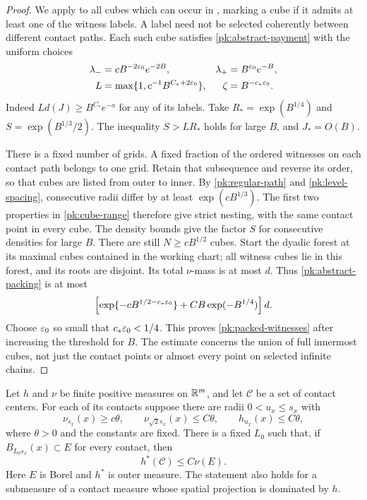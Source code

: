 \begin{proof}
We apply  to all cubes which can occur in
, marking a cube if it admits at least one of
the witness labels.  A label need not be selected coherently
between different contact paths.  Each such cube satisfies
\eqref{pk:abstract-payment} with the uniform choices
\[
 \begin{aligned}
 \lambda_-&=cB^{-2\varepsilon_0}e^{-2B},&
 \lambda_+&=B^{\varepsilon_0}e^{-B},\\
 L&=\max\{1,c^{-1}B^{C_*+2\varepsilon_0}\},&
 \zeta&=B^{-c_*\varepsilon_0}.
 \end{aligned}
\]
Indeed $Ld(J)\ge B^{C_*}e^{-a}$ for any of its labels.
Take $R_* =\exp(B^{1/4})$ and
$S=\exp(B^{1/3}/2)$.  The inequality $S>LR_*$ holds for
large $B$, and $J_*=O(B)$.

There is a fixed number of grids.  A fixed fraction of the
ordered witnesses on each contact path belongs to one grid.
Retain that subsequence and reverse its order, so that cubes
are listed from outer to inner.  By \eqref{pk:regular-path}
and \eqref{pk:level-spacing}, consecutive radii differ by at
least $\exp(cB^{1/3})$.  The first two properties in
\eqref{pk:cube-range} therefore give strict nesting, with the
same contact point in every cube.  The density bounds give
the factor $S$ for consecutive densities for large $B$.
There are still $N\ge cB^{1/2}$ cubes.  Start the dyadic
forest at its maximal cubes contained in the working chart;
all witness cubes lie in this forest, and its roots are
disjoint.  Its total $\nu$-mass is at most $d$.
Thus \eqref{pk:abstract-packing} is at most
\[
 \left[\exp\{-cB^{1/2-c_*\varepsilon_0}\}
          +CB\exp(-B^{1/4})\right]d.
\]
Choose $\varepsilon_0$ so small that $c_*\varepsilon_0<1/4$.
This proves \eqref{pk:packed-witnesses} after increasing the
threshold for $B$.  The estimate concerns the union of full
innermost cubes, not just the contact points or almost every
point on selected infinite chains.
\end{proof}

\begin{lemma}\label{pk:contact-charge}
Let $h$ and $\nu$ be finite positive measures on $\mathbb R^m$, and let
$\mathcal C$ be a set of contact centers.  For each of its
contacts suppose there are radii $0<u_x\le s_x$ with
\begin{equation}\label{pk:charge-hypotheses}
 \nu_{s_x}(x)\ge c\theta,\qquad
 \nu_{\sqrt2s_x}(x)\le C\theta,\qquad
 h_{u_x}(x)\le C\theta,
\end{equation}
where $\theta>0$ and the constants are fixed.  There is a
fixed $L_0$ such that, if $B_{L_0s_x}(x)\subset E$ for every
contact, then
\begin{equation}\label{pk:charge-bound}
 h^*(\mathcal C)\le C\nu(E).
\end{equation}
Here $E$ is Borel and $h^*$ is outer measure.  The statement
also holds for a submeasure of a contact measure whose spatial
projection is dominated by $h$.
\end{lemma}

